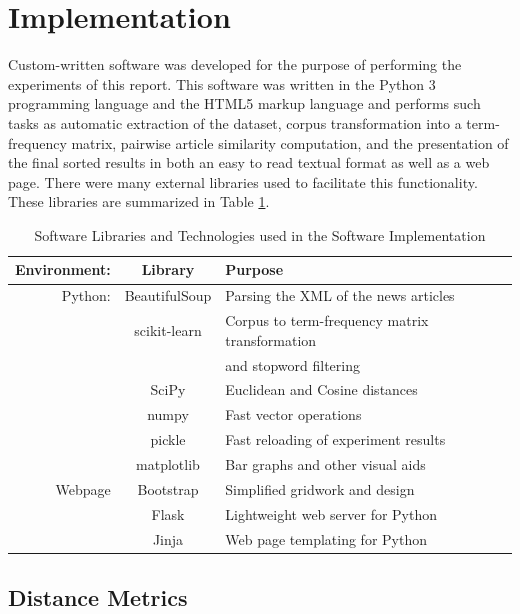 \documentclass[11pt]{article}
\begin{document}

\section{Implementation} \label{sec:software}

Custom-written software was developed for the purpose of performing the experiments of this report. This software was written in the Python 3 programming language and the HTML5 markup language and performs such tasks as automatic extraction of the dataset, corpus transformation into a term-frequency matrix, pairwise article similarity computation, and the presentation of the final sorted results in both an easy to read textual format as well as a web page.
There were many external libraries used to facilitate this functionality.
These libraries are summarized in Table \ref{tab:libraries}.

\begin{table}[h] \label{tab:libraries}
	\centering
	\begin{tabular}{ r|c|l }
		\hline
		Environment: & Library & Purpose \\ \hline
		Python: & BeautifulSoup & Parsing the XML of the news articles \\
		&	scikit-learn\cite{scikit-learn} & Corpus to term-frequency matrix transformation \\
		& & and stopword filtering \\
		& 	SciPy\cite{scipy} & Euclidean and Cosine distances \\
		&   numpy & Fast vector operations \\
		&  pickle & Fast reloading of experiment results \\
		& matplotlib & Bar graphs and other visual aids \\ \hline
		Webpage & Bootstrap & Simplified gridwork and design \\
		&  Flask  & Lightweight web server for Python \\
		& Jinja & Web page templating for Python
	\end{tabular}
	
	\caption{Software Libraries and Technologies used in the Software Implementation}
\end{table}

\subsection{Distance Metrics}
\end{document}
